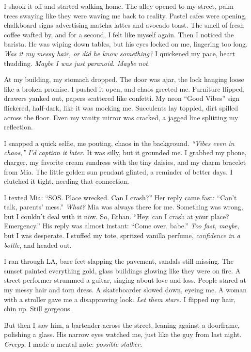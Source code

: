 \documentclass[12pt]{article} %
\begin{document}
I shook it off and started walking home. The alley opened to my street, palm trees swaying like they were waving me back to reality. Pastel cafes were opening, chalkboard signs advertising matcha lattes and avocado toast. The smell of fresh coffee wafted by, and for a second, I felt like myself again. Then I noticed the barista. He was wiping down tables, but his eyes locked on me, lingering too long. \textit{Was it my messy hair, or did he know something?} I quickened my pace, heart thudding. \textit{Maybe I was just paranoid. Maybe not.}

At my building, my stomach dropped. The door was ajar, the lock hanging loose like a broken promise. I pushed it open, and chaos greeted me. Furniture flipped, drawers yanked out, papers scattered like confetti. My neon “Good Vibes” sign flickered, half-dark, like it was mocking me. Succulents lay toppled, dirt spilled across the floor. Even my vanity mirror was cracked, a jagged line splitting my reflection.

I snapped a quick selfie, me pouting, chaos in the background. \textit{“Vibes even in chaos,” I’d caption it later.} It was silly, but it grounded me. I grabbed my phone, charger, my favorite cream sundress with the tiny daisies, and my charm bracelet from \textnormal{Mia}. The little golden sun pendant glinted, a reminder of better days. I clutched it tight, needing that connection.

I texted \textnormal{Mia}: “SOS. Place wrecked. Can I crash?” Her reply came fast: “Can’t talk, parents’ mess.” \textit{What?} \textnormal{Mia} was always there for me. Something was wrong, but I couldn’t deal with it now. So, \textnormal{Ethan}. “Hey, can I crash at your place? Emergency.” His reply was almost instant: “Come over, babe.” \textit{Too fast, maybe,} but I was desperate. I stuffed my tote, spritzed vanilla perfume, \textit{confidence in a bottle}, and headed out.

I ran through LA, bare feet slapping the pavement, sandals still missing. The sunset painted everything gold, glass buildings glowing like they were on fire. A street performer strummed a guitar, singing about love and loss. People stared at my messy hair and torn dress. A skateboarder slowed down, eyeing me. A woman with a stroller gave me a disapproving look. \textit{Let them stare.} I flipped my hair, chin up. Still gorgeous.

But then I saw him, a bartender across the street, leaning against a doorframe, polishing a glass. His narrow eyes watched me, just like the guy from last night. \textit{Creepy.} I made a mental note: \textit{possible stalker.}
\end{document}

